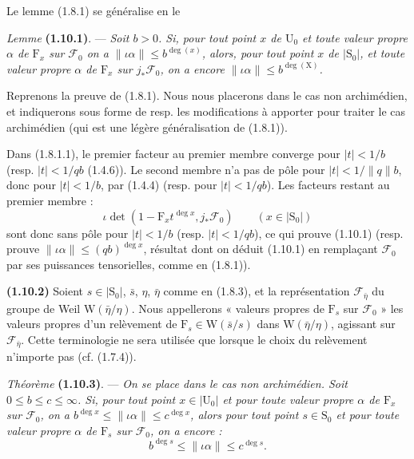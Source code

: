\documentclass[11pt,leqno]{article}
\begin{document}
Le lemme (1.8.1) se généralise en le

\textit{Lemme} \textbf{(1.10.1)}. — \textit{Soit \(b>0\). Si, pour tout point \(x\) de \(\mathrm{U}_0\) et toute valeur propre \(\alpha\) de \(\mathrm{F}_x\) sur \(\mathscr{F}_0\) on a \(\lVert\iota\alpha\rVert\leq b^{\deg(x)}\), alors, pour tout point \(x\) de \(\lvert\mathrm{S}_0\rvert\), et toute valeur propre \(\alpha\) de \(\mathrm{F}_x\) sur \(j_*\mathscr{F}_0\), on a encore \(\lVert\iota\alpha\rVert\leq b^{\deg(\mathrm{X})}\).}

Reprenons la preuve de (1.8.1). Nous nous placerons dans le cas non archimédien, et indiquerons sous forme de resp. les modifications à apporter pour traiter le cas archimédien (qui est une légère généralisation de (1.8.1)).

Dans (1.8.1.1), le premier facteur au premier membre converge pour \(\lvert t\rvert<1/b\) (resp. \(\lvert t\rvert<1/qb\) (1.4.6)). Le second membre n’a pas de pôle pour \(\lvert t\rvert<1/\lVert q\rVert b\), donc pour \(\lvert t\rvert<1/b\), par (1.4.4) (resp. pour \(\lvert t\rvert<1/qb\)). Les facteurs restant au premier membre :
\[
\iota\det(1-\mathrm{F}_xt^{\deg x},j_*\mathscr{F}_0)
\qquad (x\in\lvert\mathrm{S}_0\rvert)
\]
sont donc sans pôle pour \(\lvert t\rvert<1/b\) (resp. \(\lvert t\rvert<1/qb\)), ce qui prouve (1.10.1) (resp. prouve \(\lVert\iota\alpha\rVert\leq(qb)^{\deg x}\), résultat dont on déduit (1.10.1) en remplaçant \(\mathscr{F}_0\) par ses puissances tensorielles, comme en (1.8.1)).

\textbf{(1.10.2)} Soient \(s\in\lvert\mathrm{S}_0\rvert\), \(\bar{s}\), \(\eta\), \(\bar{\eta}\) comme en (1.8.3), et la représentation \(\mathscr{F}_{\bar{\eta}}\) du groupe de Weil \(\mathrm{W}(\bar{\eta}/\eta)\). Nous appellerons « valeurs propres de \(\mathrm{F}_s\) sur \(\mathscr{F}_0\) » les valeurs propres d’un relèvement de \(\mathrm{F}_s\in\mathrm{W}(\bar{s}/s)\) dans \(\mathrm{W}(\bar{\eta}/\eta)\), agissant sur \(\mathscr{F}_{\bar{\eta}}\). Cette terminologie ne sera utilisée que lorsque le choix du relèvement n’importe pas (cf. (1.7.4)).

\textit{Théorème} \textbf{(1.10.3)}. — \textit{On se place dans le cas non archimédien. Soit \(0\leq b\leq c\leq\infty\). Si, pour tout point \(x\in\lvert\mathrm{U}_0\rvert\) et pour toute valeur propre \(\alpha\) de \(\mathrm{F}_x\) sur \(\mathscr{F}_0\), on a \(b^{\deg x}\leq\lVert\iota\alpha\rVert\leq c^{\deg x}\), alors pour tout point \(s\in\mathrm{S}_0\) et pour toute valeur propre \(\alpha\) de \(\mathrm{F}_s\) sur \(\mathscr{F}_0\), on a encore :}
\[
b^{\deg s}\leq\lVert\iota\alpha\rVert\leq c^{\deg s}.
\]
\end{document}
